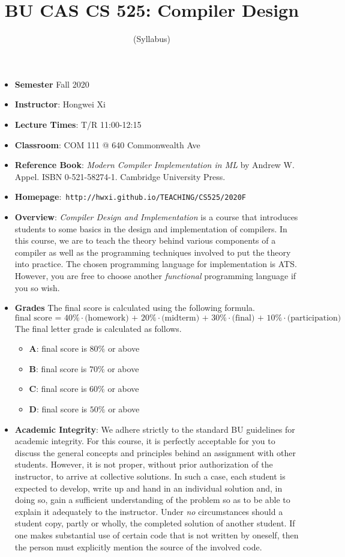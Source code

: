 \documentclass[11pt]{article}
\title{BU CAS CS 525: Compiler Design}
\author{(Syllabus)}
\date{}
\begin{document}
\maketitle
\thispagestyle{empty}

\begin{itemize}
\item {\bf Semester} Fall 2020
\item {\bf Instructor}: Hongwei Xi
\item {\bf Lecture Times}: T/R 11:00-12:15
\item {\bf Classroom}: COM 111 @ 640 Commonwealth Ave
\item {\bf Reference Book}:\kern6pt
{\em Modern Compiler Implementation in ML} by Andrew W. Appel.  ISBN
0-521-58274-1. Cambridge University Press.
\item {\bf Homepage}:~{\tt http://hwxi.github.io/TEACHING/CS525/2020F}
\item {\bf Overview}:
{\em Compiler Design and Implementation} is a course that introduces
students to some basics in the design and implementation of compilers. In
this course, we are to teach the theory behind various components of a
compiler as well as the programming techniques involved to put the theory
into practice. The chosen programming language for implementation is
ATS. However, you are free to choose another {\em functional} programming
language if you so wish.

\item {\bf Grades}
The final score is calculated using the following formula.
\[\mbox{final score = 40\%$\cdot$(homework) + 20\%$\cdot$(midterm) + 30\%$\cdot$(final) + 10\%$\cdot$(participation)}\]
The final letter grade is calculated as follows.
\begin{itemize}
\item{\bf A}: final score is $80\%$ or above
\item{\bf B}: final score is $70\%$ or above
\item{\bf C}: final score is $60\%$ or above
\item{\bf D}: final score is $50\%$ or above
\end{itemize}

\item {\bf Academic Integrity}:
We adhere strictly to the standard BU guidelines for academic
integrity. For this course, it is perfectly acceptable for you to discuss
the general concepts and principles behind an assignment with other
students. However, it is not proper, without prior authorization of the
instructor, to arrive at collective solutions. In such a case, each student
is expected to develop, write up and hand in an individual solution and, in
doing so, gain a sufficient understanding of the problem so as to be able
to explain it adequately to the instructor.  Under {\em no} circumstances
should a student copy, partly or wholly, the completed solution of another
student. If one makes substantial use of certain code that is not written by
oneself, then the person must explicitly mention the source of the involved
code.

\end{itemize}
\end{document}
